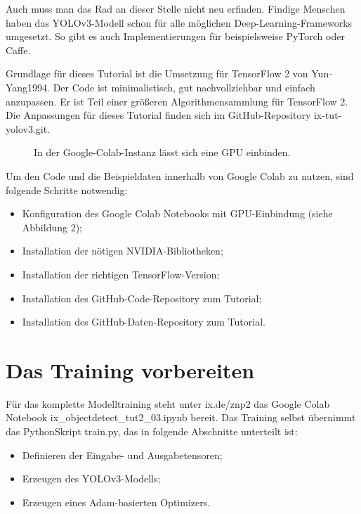 	Auch muss man das Rad an dieser Stelle nicht neu erfinden. Findige Menschen haben das YOLOv3-Modell schon für alle möglichen Deep-Learning-Frameworks umgesetzt. So gibt es auch Implementierungen für beispielsweise PyTorch oder Caffe. 

	Grundlage für dieses Tutorial ist die Umsetzung für TensorFlow 2 von Yun­Yang1994. Der Code ist minimalistisch, gut nachvollziehbar und einfach anzupassen. Er ist Teil einer größeren Algorithmensammlung für TensorFlow 2. Die Anpassungen für dieses Tutorial finden sich im GitHub-Repository ix-tut-yolov3.git. 
	
\begin{figure}
	\caption{In der Google-Colab-Instanz lässt sich eine GPU einbinden. }
\end{figure}	

Um den Code und die Beispieldaten innerhalb von Google Colab zu nutzen, sind folgende Schritte notwendig: 

\begin{itemize}
	\item Konfiguration des Google Colab Notebooks mit GPU-Einbindung (siehe Abbildung 2); 
	\item Installation der nötigen NVIDIA-Bibliotheken; 
	\item Installation der richtigen TensorFlow-­Version; 
	\item Installation des GitHub-Code-Repository zum Tutorial; 
	\item Installation des GitHub-Daten-Repository zum Tutorial. 

\end{itemize}	

\section{Das Training vorbereiten}

Für das komplette Modelltraining steht unter ix.de/znp2 das Google Colab Notebook ix\_objectdetect\_tut2\_03.ipynb bereit. Das Training selbst übernimmt das Python­Skript train.py, das in folgende Abschnitte unterteilt ist:  

\begin{itemize}
	\item 	Definieren der Eingabe- und Ausgabetensoren; 
	\item Erzeugen des YOLOv3-Modells; 
	\item Erzeugen eines Adam-basierten Optimizers. 
\end{itemize}

